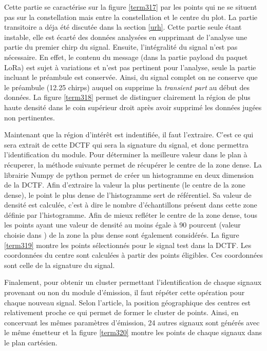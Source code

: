 Cette partie se caractérise sur la figure \ref{term317} par les points qui ne se situent pas sur la constellation mais entre la constellation et le centre du plot. La partie transitoire a déja été discutée dans la section \ref{urh}. Cette partie seule étant instable, elle est écarté des données analysées en supprimant de l'analyse une partie du premier chirp du signal. Ensuite, l'intégralité du signal n'est pas nécessaire. En effet, le contenu du message (dans la partie payload du paquet \ac{LoRa}) est sujet à variations et n'est pas pertinent pour l'analyse, seule la partie incluant le préambule est conservée. Ainsi, du signal complet on ne conserve que le préambule (12.25 chirps) auquel on supprime la \textit{transient part} au début des données. La figure \ref{term318} permet de distinguer clairement la région de plus haute densité dans le coin supérieur droit après avoir supprimé les données jugées non pertinentes.



Maintenant que la région d'intérêt est indentifiée, il faut l'extraire. C'est ce qui sera extrait de cette \ac{DCTF} qui sera la signature du signal, et donc permettra l'identification du module. Pour déterminer la meilleure valeur dans le plan à récuperer, la méthode suivante permet de récupérer le centre de la zone dense. La librairie Numpy de python permet de créer un histogramme en deux dimension de la \ac{DCTF}. Afin d'extraire la valeur la plus pertinente (le centre de la zone dense), le point le plus dense de l'histogramme sert de référentiel. Sa valeur de densité est calculée, c'est à dire le nombre d'échantillons présent dans cette zone définie par l'histogramme. Afin de mieux refléter le centre de la zone dense, tous les points ayant une valeur de densité au moins égale à 90 pourcent (valeur choisie dans \cite{loraDCTF}) de la zone la plus dense sont également considérés. La figure \ref{term319} montre les points sélectionnés pour le signal test dans la \ac{DCTF}. Les coordonnées du centre sont calculées à partir des points éligibles. Ces coordonnées sont celle de la signature du signal. 

\vspace{0.1cm}

Finalement, pour obtenir un cluster permettant l'identification de chaque signaux provenant ou non du module d'émission, il faut répéter cette opération pour chaque nouveau signal. Selon l'article, la position géographique des centres est relativement proche ce qui permet de former le cluster de points. Ainsi, en concervant les mêmes paramètres d'émission, 24 autres signaux sont générés avec le même émetteur et la figure \ref{term320} montre les points de chaque signaux dans le plan cartésien.

